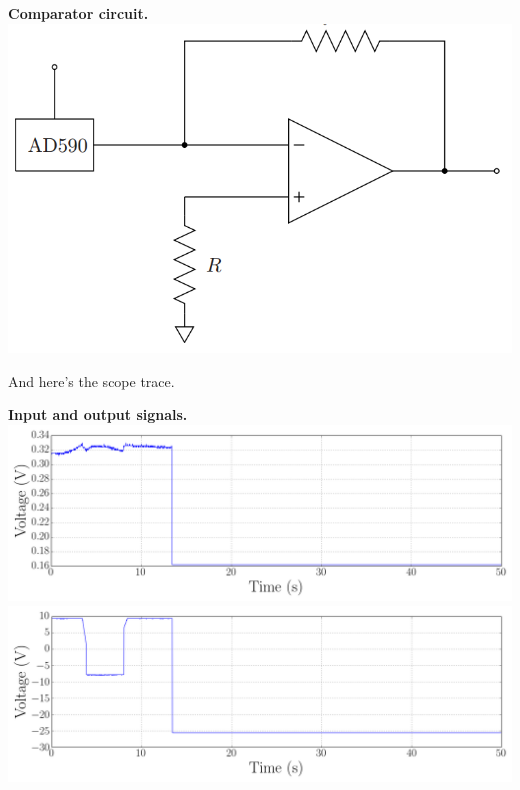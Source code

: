 \documentclass{article}
\newenvironment{2colfig}{
  \par\medskip\noindent\minipage{\linewidth}
} {
  \endminipage\par\medskip
}
\begin{document}
\begin{multicols*}{2}
\begin{2colfig}
  \center
  {\bf Comparator circuit.} \newline
  \includegraphics[scale=.4]{circuit3}
  \label{fig:circ3}
\end{2colfig}


And here's the scope trace.
\begin{2colfig}
  \center
  {\bf Input and output signals.}
  \includegraphics[scale=.22]{day3/ALL0006/F0006CH1}
  \includegraphics[scale=.22]{day3/ALL0006/F0006CH2}
  \label{fig:plot6}
\end{2colfig}
\end{multicols*}
\end{document}
